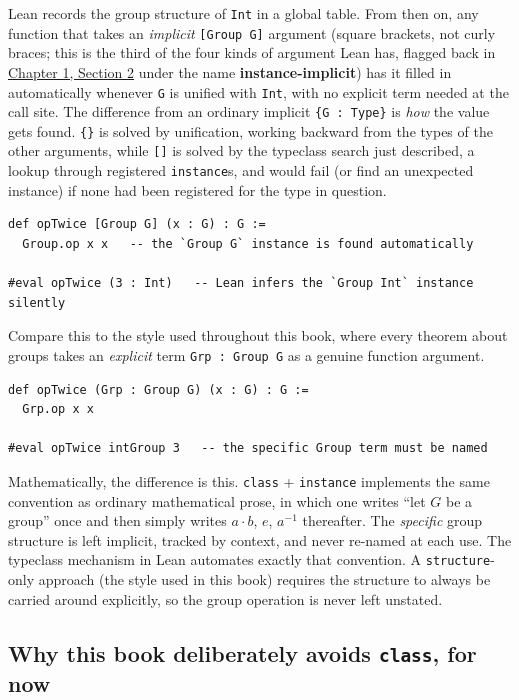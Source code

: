 Lean records the group structure of \texttt{Int} in a global table. From then on, any function that takes an \emph{implicit} \texttt{[Group G]} argument (square brackets, not curly braces; this is the third of the four kinds of argument Lean has, flagged back in \hyperref[sec:01-basics:02-def-let-implicit:1]{Chapter 1, Section 2} under the name \textbf{instance-implicit}) has it filled in automatically whenever \texttt{G} is unified with \texttt{Int}, with no explicit term needed at the call site. The difference from an ordinary implicit \texttt{\{G : Type\}} is \emph{how} the value gets found. \texttt{\{\}} is solved by unification, working backward from the types of the other arguments, while \texttt{[]} is solved by the typeclass search just described, a lookup through registered \texttt{instance}s, and would fail (or find an unexpected instance) if none had been registered for the type in question.

\begin{lstlisting}
def opTwice [Group G] (x : G) : G :=
  Group.op x x   -- the `Group G` instance is found automatically

#eval opTwice (3 : Int)   -- Lean infers the `Group Int` instance silently
\end{lstlisting}

Compare this to the style used throughout this book, where every theorem about groups takes an \emph{explicit} term \texttt{Grp : Group G} as a genuine function argument.

\begin{lstlisting}
def opTwice (Grp : Group G) (x : G) : G :=
  Grp.op x x

#eval opTwice intGroup 3   -- the specific Group term must be named
\end{lstlisting}

Mathematically, the difference is this. \texttt{class} + \texttt{instance} implements the same convention as ordinary mathematical prose, in which one writes ``let \(G\) be a group'' once and then simply writes \(a \cdot b\), \(e\), \(a^{-1}\) thereafter. The \emph{specific} group structure is left implicit, tracked by context, and never re-named at each use. The typeclass mechanism in Lean automates exactly that convention. A \texttt{structure}-only approach (the style used in this book) requires the structure to always be carried around explicitly, so the group operation is never left unstated.

\subsection{\texorpdfstring{Why this book deliberately avoids \texttt{class}, for now}{Why this book deliberately avoids class, for now}}\label{sec:06-rigor-check:01-structure-vs-class:3}


